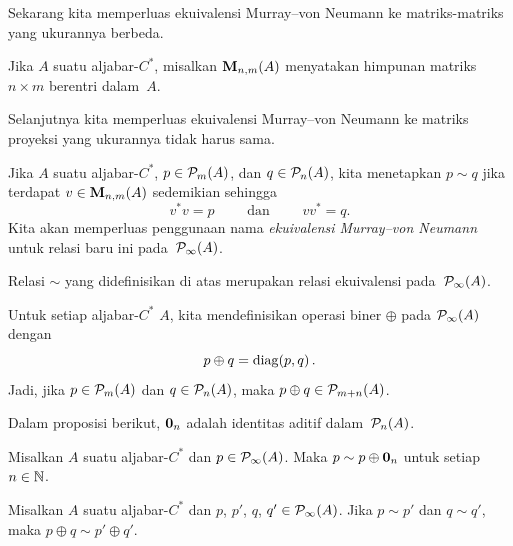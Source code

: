 Sekarang kita memperluas ekuivalensi Murray--von Neumann ke matriks-matriks yang ukurannya berbeda.

\begin{notn} Jika $A$ suatu aljabar-$C^*$, misalkan
$\mathbf{M}_{n,m}({A})$ menyatakan himpunan matriks $n \times m$ berentri dalam~$A$.
\end{notn}

Selanjutnya kita memperluas ekuivalensi Murray--von Neumann ke matriks proyeksi yang ukurannya tidak harus sama.

\begin{defn}\label{0060316fa} Jika $A$ suatu aljabar-$C^*$, $p \in \mathcal{P}_m(A)$, dan $q \in \mathcal{P}_n(A)$, kita menetapkan
$p \sim q$ jika terdapat $v \in \mathbf{M}_{n,m}({A})$ sedemikian sehingga
  \[ v^*v = p \qquad\text{ dan } \qquad  vv^* = q. \]
Kita akan memperluas penggunaan nama \emph{ekuivalensi Murray--von Neumann} untuk relasi baru ini pada~$\mathcal{P}_\infty(A)$.
\end{defn}

\begin{prop}\label{0060317} Relasi $\sim$ yang didefinisikan di atas merupakan relasi
ekuivalensi pada~$\mathcal{P}_\infty(A)$.
\end{prop}

\begin{defn} Untuk setiap aljabar-$C^*$ $A$, kita mendefinisikan operasi biner $\oplus$ pada $\mathcal{P}_\infty(A)$ dengan
   \[ p \oplus q = \operatorname{diag}(p,q)\,. \]
Jadi, jika $p \in \mathcal{P}_m(A)$ dan $q \in \mathcal{P}_n(A)$, maka $p \oplus q \in \mathcal{P}_{m+n}(A)$.
\end{defn}

Dalam proposisi berikut, $\mathbf{0}_n$ adalah identitas aditif dalam~$\mathcal{P}_n(A)$.

\begin{prop}\label{0060324} Misalkan $A$ suatu aljabar-$C^*$ dan $p \in \mathcal{P}_\infty(A)$.
Maka $p \sim p \oplus \mathbf{0}_n$ untuk setiap $n \in \mathbb{N}$.
\end{prop}

\begin{prop}\label{0060327} Misalkan $A$ suatu aljabar-$C^*$ dan $p$, $p'$, $q$, $q' \in
\mathcal{P}_\infty(A)$. Jika $p \sim p'$ dan $q \sim q'$, maka $p \oplus q \sim p' \oplus q'$.
\end{prop}

